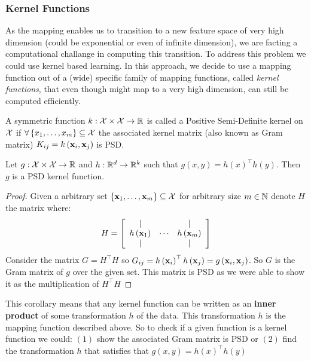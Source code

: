 \subsubsection{Kernel Functions}
As the mapping enables us to transition to a new feature space of very high dimension (could be exponential or even of infinite dimension), we are facting a computational challange in computing this transition. To address this problem we could use kernel based learning. In this approach, we decide to use a mapping function out of a (wide) specific family of mapping functions, called \textit{kernel functions}, that even though might map to a very high dimension, can still be computed efficiently.\\

\begin{definition}
	A symmetric function $k:\mathcal{X}\times\mathcal{X}\rightarrow\mathbb{R}$ is called a Positive Semi-Definite kernel on $\mathcal{X}$ if $\forall \left\{x_1,\ldots,x_m\right\}\subseteq\mathcal{X}$ the associated kernel matrix (also known as Gram matrix) $K_{ij}=k\left(\mathbf{x}_i,\mathbf{x}_j\right)$ is PSD.
\end{definition}
\begin{corollary}
	Let $g:\mathcal{X}\times\mathcal{X}\rightarrow\mathbb{R}$ and $h:\mathbb{R}^d\rightarrow\mathbb{R}^k$ such that $g\left(x,y\right)=h\left(x\right)^\top h\left(y\right)$. Then $g$ is a PSD kernel function.
\end{corollary}
\begin{proof}
	Given a arbitrary set $\left\{\mathbf{x}_1,\ldots,\mathbf{x}_m\right\}\subseteq\mathcal{X}$ for arbitrary size $m\in\mathbb{N}$ denote $H$ the matrix where: $$ H=\left[\begin{array}{ccc}
		| & & |\\
		h\left(\mathbf{x}_1\right) & \cdots & h\left(\mathbf{x}_m\right)\\
		| & & |
	\end{array}\right] $$
	Consider the matrix $G=H^\top H$ so $G_{ij}=h\left(\mathbf{x}_i\right)^\top h\left(\mathbf{x}_j\right)=g\left(\mathbf{x}_i,\mathbf{x}_j\right)$. So $G$ is the Gram matrix of $g$ over the given set. This matrix is PSD as we were able to show it as the multiplication of $H^\top H$ 
\end{proof}

This corollary means that any kernel function can be written as an \textbf{inner product} of some transformation $h$ of the data. This transformation $h$ is the mapping function described above. So to check if a given function is a kernel function we could: $\left(1\right)$ show the associated Gram matrix is PSD or $\left(2\right)$ find the transformation $h$ that satisfies that $g\left(x,y\right)=h\left(x\right)^\top h\left(y\right)$~\\

